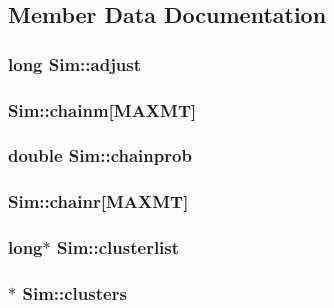 \subsection{Member Data Documentation}
\hypertarget{struct_sim_a26476b5125d2eba8af2931d32f8cff12}{
\subsubsection[{adjust}]{\setlength{\rightskip}{0pt plus 5cm}long Sim\+::adjust}}\label{struct_sim_a26476b5125d2eba8af2931d32f8cff12}
\hypertarget{struct_sim_a7daf59f4e267bb80f1db9c607a0858ff}{
\subsubsection[{chainm}]{ Sim\+::chainm\mbox{[}{\bf M\+A\+X\+M\+T}\mbox{]}}}\label{struct_sim_a7daf59f4e267bb80f1db9c607a0858ff}
\hypertarget{struct_sim_a711ff4e92fd436425a29d061973d188c}{
\subsubsection[{chainprob}]{\setlength{\rightskip}{0pt plus 5cm}double Sim\+::chainprob}}\label{struct_sim_a711ff4e92fd436425a29d061973d188c}
\hypertarget{struct_sim_adec41082dfe3aa3210a1fbc5f0ade382}{
\subsubsection[{chainr}]{ Sim\+::chainr\mbox{[}{\bf M\+A\+X\+M\+T}\mbox{]}}}\label{struct_sim_adec41082dfe3aa3210a1fbc5f0ade382}
\hypertarget{struct_sim_a1feddf9821ae3b1082ca29fd60adecca}{
\subsubsection[{clusterlist}]{\setlength{\rightskip}{0pt plus 5cm}long$\ast$ Sim\+::clusterlist}}\label{struct_sim_a1feddf9821ae3b1082ca29fd60adecca}
\hypertarget{struct_sim_acb85dbc7776928fe57c9d46972946f70}{
\subsubsection[{clusters}]{$\ast$ Sim\+::clusters}}\label{struct_sim_acb85dbc7776928fe57c9d46972946f70}
